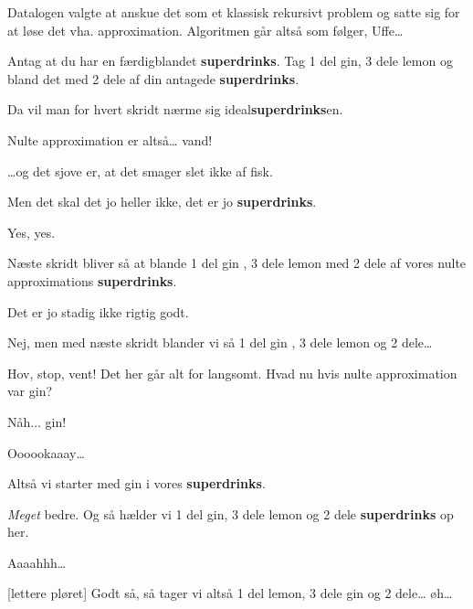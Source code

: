 \documentclass[a4paper,11pt]{article}
\newcommand{\sd}{\textbf{superdrinks}}
\begin{document}
\begin{sketch}
   Datalogen valgte at anskue det som et klassisk rekursivt
  problem og satte sig for at løse det vha. approximation. Algoritmen
  går altså som følger, Uffe\ldots
  
   Antag at du har en færdigblandet \sd. Tag 1 del gin, 3 dele
  lemon og bland det med 2 dele af din antagede \sd.
  
   Da vil man for hvert skridt nærme sig ideal\sd{}en.
  
  
   Nulte approximation er altså\ldots{} vand! 
  
   \ldots{}og det sjove er, at det smager slet ikke af fisk.
  
   Men det skal det jo heller ikke, det er jo \sd.
  
   Yes, yes.
  
   Næste skridt bliver så at blande 1 del gin , 3 dele lemon med 2 dele af vores nulte
  approximations \sd. 
  
   Det er jo stadig ikke rigtig godt.
  
   Nej, men med næste skridt blander vi så 1 del gin , 3 dele lemon  og 2
  dele\ldots
  
    Hov, stop, vent! Det her går
  alt for langsomt. Hvad nu hvis nulte approximation var gin?
  
    Nåh... gin!
  
   Oooookaaay\ldots
  
   Altså vi starter med gin i vores \sd.
  
  
   \emph{Meget} bedre.  Og så
  hælder vi 1 del gin, 3 dele lemon og 2 dele \sd{} op her.
  
  
   Aaaahhh\ldots
  
  [lettere pløret] Godt så, så tager vi altså 1 del lemon, 3
  dele gin og 2 dele\ldots{} øh\ldots {}
  

\end{sketch}
\end{document}
